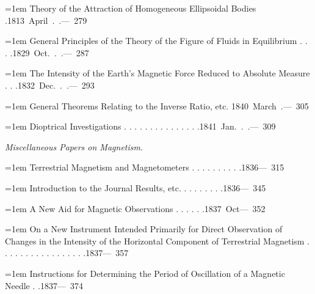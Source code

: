 \noindent\hangindent=1em Theory of the Attraction of Homogeneous Ellipsoidal Bodies .\unskip\hspace{1em plus 1fill}\mbox{1813 April . .\quad — 279}\par\smallskip
\noindent\hangindent=1em General Principles of the Theory of the Figure of Fluids in Equilibrium . . . .\unskip\hspace{1em plus 1fill}\mbox{1829 Oct. . .\quad — 287}\par\smallskip
\noindent\hangindent=1em The Intensity of the Earth’s Magnetic Force Reduced to Absolute Measure . . .\unskip\hspace{1em plus 1fill}\mbox{1832 Dec. . .\quad — 293}\par\smallskip
\noindent\hangindent=1em General Theorems Relating to the Inverse Ratio, etc. \unskip\hspace{1em plus 1fill}\mbox{1840 March .\quad — 305}\par\smallskip
\noindent\hangindent=1em Dioptrical Investigations . . . . . . . . . . . . . . .\unskip\hspace{1em plus 1fill}\mbox{1841 Jan. . .\quad — 309}\par\smallskip
\par{}\medskip\noindent\textit{Miscellaneous Papers on Magnetism.}\par\smallskip
\noindent\hangindent=1em Terrestrial Magnetism and Magnetometers . . . . . . . . . .\unskip\hspace{1em plus 1fill}\mbox{1836\quad — 315}\par\smallskip
\noindent\hangindent=1em Introduction to the Journal Results, etc. . . . . . . . .\unskip\hspace{1em plus 1fill}\mbox{1836\quad — 345}\par\smallskip
\noindent\hangindent=1em A New Aid for Magnetic Observations . . . . . .\unskip\hspace{1em plus 1fill}\mbox{1837 Oct\quad — 352}\par\smallskip
\noindent\hangindent=1em On a New Instrument Intended Primarily for Direct Observation of Changes in the Intensity of the Horizontal Component of Terrestrial Magnetism . . . . . . . . . . . . . . . . .\unskip\hspace{1em plus 1fill}\mbox{1837\quad — 357}\par\smallskip
\noindent\hangindent=1em Instructions for Determining the Period of Oscillation of a Magnetic Needle . .\unskip\hspace{1em plus 1fill}\mbox{1837\quad — 374}\par\smallskip
